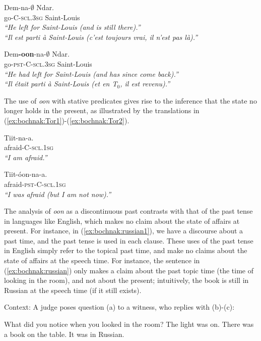 \documentclass[output=paper]{langsci/langsci}
\begin{document}
\ea
\gll Dem-na-$\emptyset$ Ndar.\\
go-C-\textsc{scl.3sg} Saint-Louis\\
\glt \textit{``He left for Saint-Louis (and is still there).''}\\
\textit{``Il est parti \`a Saint-Louis (c'est toujours vrai, il n'est
  pas l\`a).''} \hfill \citep[p.~279]{robert91approche}\label{ex:bochnak:Robert1}
\z

\ea
\gll Dem\textbf{-oon}-na-$\emptyset$ Ndar.\\
go-\textsc{pst}-C-\textsc{scl.3sg} Saint-Louis\\
\glt \textit{``He had left for Saint-Louis (and has since come
  back).''}\\\textit{``Il \'etait parti \`a Saint-Louis (et en T$_0$,
  il est revenu).''} \hfill \citep[p.~279]{robert91approche}\label{ex:bochnak:Robert2}
\z


The use of \textit{oon} with stative predicates gives rise to the inference that the state no longer holds in the present, as illustrated by the translations in (\ref{ex:bochnak:Tor1})-(\ref{ex:bochnak:Tor2}).

\ea
\gll Tiit-na-a.\\
afraid-C-\textsc{scl.1sg}\\
\glt \textit{``I am afraid.''}\hfill\citep[p.~25]{torrence12clause}\label{ex:bochnak:Tor1}
\z

\ea
\gll Tiit-\'oon-na-a.\\
afraid-\textsc{pst}-C-\textsc{scl.1sg}\\
\glt \textit{``I was afraid (but I am not now).''}\hfill\citep[p.~26]{torrence12clause}\label{ex:bochnak:Tor2}
\z

The analysis of \textit{oon} as a discontinuous past contrasts with that of the past tense in languages like English, which makes no claim about the state of affairs at present. For instance, in (\ref{ex:bochnak:russian1}), we have a discourse about a past time, and the past tense is used in each clause. These uses of the past tense in English simply refer to the topical past time, and make no claims about the state of affairs at the speech time. For instance, the sentence in (\ref{ex:bochnak:russian}) only makes a claim about the past topic time (the time of looking in the room), and not about the present; intuitively, the book is still in Russian at the speech time (if it still exists).

\begin{exe}
\ex\label{ex:bochnak:russian1} Context: A judge poses question (a) to a witness, who replies with (b)-(c):
\begin{xlist}
\ex What did you notice when you looked in the room?
\ex The light was on. There was a book on the table.
\ex\label{ex:bochnak:russian} It was in Russian. \hfill \citep{klein94time}
\end{xlist}
\end{exe}
\end{document}
